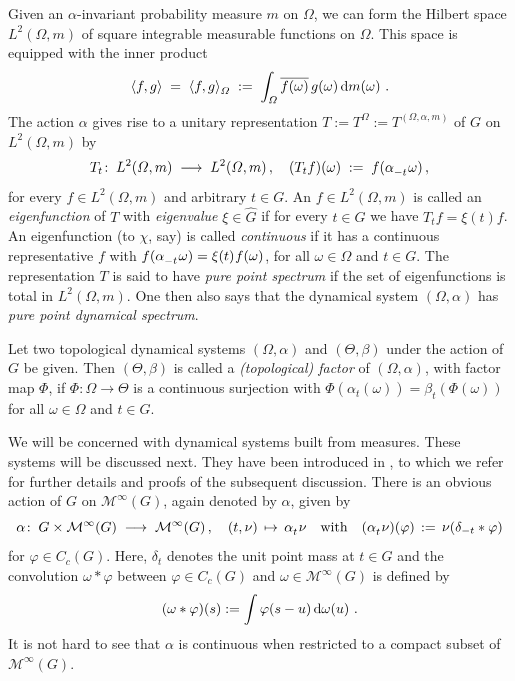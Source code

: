 \documentclass[11pt, a4wide]{amsart}
\newcommand{\ts}{\hspace{0.5pt}}
\newcommand{\dd}{\,{\rm d}}
\newcommand{\MTB}{\mathcal{M}^{\infty}(G)}
\newcommand{\Oomega}{(\varOmega,\alpha)}
\newcommand{\Ttheta}{(\varTheta,\beta)}
\newcommand{\LO}{L^2 (\varOmega,m)}
\newcommand{\Ghat}{\widehat{G}}
\numberwithin{lemma}{section}
\begin{document}
Given an $\alpha$-invariant probability measure $m$ on $\varOmega$,
we can form the Hilbert space $\LO$ of square integrable measurable
functions on $\varOmega$. This space is equipped with the inner
product
\begin{equation*}
    \langle f, g\rangle \; = \;
    \langle f, g\rangle^{}_\varOmega \; := \;
    \int_\varOmega \overline{f(\omega)}\, g(\omega) \dd m(\omega) \ .
\end{equation*}
The action $\alpha$ gives rise to a unitary representation $T :=
T^\varOmega := T^{(\varOmega,\alpha,m)}$ of $G$ on $\LO$ by
\begin{equation*}
  T_t \! : \; \LO \; \longrightarrow \; \LO \, ,
  \quad (T_t f) (\omega) \; := \;
  f(\alpha^{}_{-t}\ts \omega) \, ,
\end{equation*}
for every $f\in \LO$ and arbitrary $t\in G$.
An $f\in \LO$ is called an {\em eigenfunction\/} of $T$ with
{\em eigenvalue\/} $\xi\in \Ghat$ if  for every
$t\in G$ we have $T_t f = \xi(t) f$.  An eigenfunction (to $\chi$, say) is called {\em continuous\/}
if it has a continuous representative $f$  with
$f(\alpha^{}_{-t} \ts \omega) = \xi(t)\ts f(\omega)$, for all
$\omega\in\varOmega$ and $t\in G$. The representation $T$ is said to have
{\em pure point spectrum\/} if the set of eigenfunctions is total in $\LO$.
One then also says that the dynamical system $\Oomega$ has
{\em pure point dynamical spectrum}.

  Let two topological dynamical systems\/ $\Oomega$ and\/ $\Ttheta$
  under the action of $G$ be given.  Then $\Ttheta$ is called a\/
  {\em (topological) factor} of $\Oomega$, with factor map\/ $\varPhi$, if\/
  $\varPhi \! : \varOmega \longrightarrow\varTheta $ is a continuous
  surjection with $\varPhi (\alpha^{}_t (\omega)) = \beta^{}_t
  (\varPhi (\omega))$ for all\/ $\omega\in \varOmega$ and\/ $t\in G$.

\smallskip

We will be concerned with dynamical systems built from measures.  These
systems will be discussed next. They have been introduced in \cite{BL,BL2}, to
which we refer for further details and proofs of the subsequent discussion.
There is an obvious action of $G$ on $\MTB$, again denoted
by $\alpha$, given by
\begin{equation*}
   \alpha \! : \; G\times  \MTB \; \longrightarrow \; \MTB
   \, , \quad (t,\nu) \, \mapsto \, \alpha^{}_t\ts \nu
   \quad \mbox{with} \quad (\alpha^{}_t \ts \nu)(\varphi) \, := \,
   \nu(\delta_{-t} \ast \varphi)
\end{equation*}
for $\varphi \in C_c (G)$.  Here, $\delta_t$ denotes the unit point
mass at $t \in G$ and the convolution $\omega \ast \varphi$ between
$\varphi\in C_c (G)$ and $\omega \in \MTB$ is defined by
%
\[ 
(\omega \ast \varphi) (s) := \int \varphi (s - u) \dd \omega(u) \ .
\]
%
It is not hard to see that $\alpha$ is continuous when restricted to a
compact subset of $\MTB$.
\end{document}
